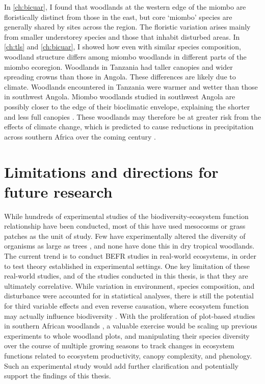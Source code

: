 \begin{refsection}
In \autoref{ch:bicuar}, I found that woodlands at the western edge of the miombo are floristically distinct from those in the east, but core `miombo' species are generally shared by sites across the region. The floristic variation arises mainly from smaller understorey species and those that inhabit disturbed areas. In \autoref{ch:tls} and \autoref{ch:bicuar}, I showed how even with similar species composition, woodland structure differs among miombo woodlands in different parts of the miombo ecoregion. Woodlands in Tanzania had taller canopies and wider spreading crowns than those in Angola. These differences are likely due to climate. Woodlands encountered in Tanzania were warmer and wetter than those in southwest Angola. Miombo woodlands studied in southwest Angola are possibly closer to the edge of their bioclimatic envelope, explaining the shorter and less full canopies \citep{}. These woodlands may therefore be at greater risk from the effects of climate change, which is predicted to cause reductions in precipitation across southern Africa over the coming century \citep{}.

\section{Limitations and directions for future research}
\label{discussion:sec:future}

While hundreds of experimental studies of the biodiversity-ecosystem function relationship have been conducted, most of this have used mesocosms or grass patches as the unit of study. Few have experimentally altered the diversity of organisms as large as trees \citep{}, and none have done this in dry tropical woodlands. The current trend is to conduct BEFR studies in real-world ecosystems, in order to test theory established in experimental settings. One key limitation of these real-world studies, and of the studies conducted in this thesis, is that they are ultimately correlative. While variation in environment, species composition, and disturbance were accounted for in statistical analyses, there is still the potential for third variable effects and even reverse causation, where ecosystem function may actually influence biodiversity \citep{}. With the proliferation of plot-based studies in southern African woodlands \citep{Ryan2020}, a valuable exercise would be scaling up previous experiments to whole woodland plots, and manipulating their species diversity over the course of multiple growing seasons to track changes in ecosystem functions related to ecosystem productivity, canopy complexity, and phenology. Such an experimental study would add further clarification and potentially support the findings of this thesis.


\end{refsection}
